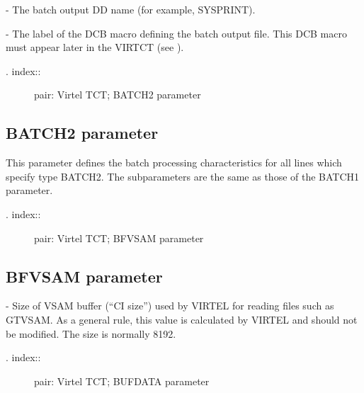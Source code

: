 \documentclass[letterpaper,10pt,english]{sphinxmanual}
\begin{document}
 - The batch output DD name (for example, SYSPRINT).

 - The label of the DCB macro defining the batch output file. This DCB macro must appear later in the VIRTCT (see {\hyperref[\detokenize{Installation_Guide:v457ig-bookmark72}]{}}).
\begin{description}
\item[{. index::}] \leavevmode
pair: Virtel TCT; BATCH2 parameter

\end{description}


\subsection{BATCH2 parameter}
\label{\detokenize{Installation_Guide:batch2-parameter}}
\begin{sphinxVerbatim}[commandchars=\\\{\}]
    
\end{sphinxVerbatim}

This parameter defines the batch processing characteristics for all lines which specify type BATCH2. The subparameters are the same as those of the BATCH1 parameter.
\begin{description}
\item[{. index::}] \leavevmode
pair: Virtel TCT; BFVSAM parameter

\end{description}


\subsection{BFVSAM parameter}
\label{\detokenize{Installation_Guide:bfvsam-parameter}}
\begin{sphinxVerbatim}[commandchars=\\\{\}]
 
\end{sphinxVerbatim}

 - Size of VSAM buffer (“CI size”) used by VIRTEL for reading files such as GTVSAM. As a general rule, this value is calculated by VIRTEL and should not be modified. The size is normally 8192.
\begin{description}
\item[{. index::}] \leavevmode
pair: Virtel TCT; BUFDATA parameter

\end{description}
\end{document}
